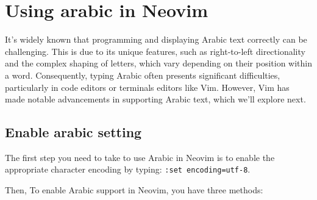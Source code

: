 \documentclass[12pt, letterpaper]{article}
\begin{document}
\section{Using arabic in Neovim}

It's widely known that programming and displaying Arabic text correctly can be challenging. This is due to its unique features, such as right-to-left directionality and the complex shaping of letters, which vary depending on their position within a word. Consequently, typing Arabic often presents significant difficulties, particularly in code editors or terminals editors like Vim. However, Vim has made notable advancements in supporting Arabic text, which we'll explore next.

\subsection{Enable arabic setting}
The first step you need to take to use Arabic in Neovim is to enable the appropriate character encoding by typing: \texttt{:set encoding=utf-8}.

Then, To enable Arabic support in Neovim, you have three methods:
\end{document}
